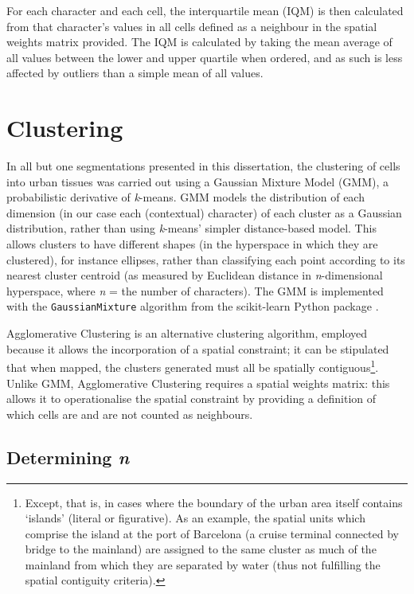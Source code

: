 \documentclass[a4paper, nobind]{templates/ociamthesis}
\begin{document}
For each character and each cell, the interquartile mean (IQM) is then calculated from that character's values in all cells defined as a neighbour in the spatial weights matrix provided. The IQM is calculated by taking the mean average of all values between the lower and upper quartile when ordered, and as such is less affected by outliers than a simple mean of all values.

\hypertarget{clustering}{%
\section{Clustering}\label{clustering}}

In all but one segmentations presented in this dissertation, the clustering of cells into urban tissues was carried out using a Gaussian Mixture Model (GMM), a probabilistic derivative of \emph{k}-means. GMM models the distribution of each dimension (in our case each (contextual) character) of each cluster as a Gaussian distribution, rather than using \emph{k}-means' simpler distance-based model. This allows clusters to have different shapes (in the hyperspace in which they are clustered), for instance ellipses, rather than classifying each point according to its nearest cluster centroid (as measured by Euclidean distance in \emph{n}-dimensional hyperspace, where \emph{n} = the number of characters). The GMM is implemented with the \texttt{GaussianMixture} algorithm from the scikit-learn Python package \citep{pedregosa2011}.

Agglomerative Clustering is an alternative clustering algorithm, employed because it allows the incorporation of a spatial constraint; it can be stipulated that when mapped, the clusters generated must all be spatially contiguous\footnote{Except, that is, in cases where the boundary of the urban area itself contains `islands' (literal or figurative). As an example, the spatial units which comprise the island at the port of Barcelona (a cruise terminal connected by bridge to the mainland) are assigned to the same cluster as much of the mainland from which they are separated by water (thus not fulfilling the spatial contiguity criteria).}. Unlike GMM, Agglomerative Clustering requires a spatial weights matrix: this allows it to operationalise the spatial constraint by providing a definition of which cells are and are not counted as neighbours.

\hypertarget{determining-n}{%
\subsection{\texorpdfstring{Determining \emph{n}}{Determining n}}\label{determining-n}}
\end{document}

